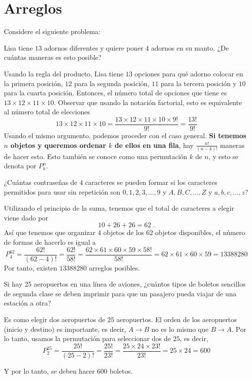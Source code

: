 \documentclass[12pt]{article}
\begin{document}
\section{Arreglos}
Considere el siguiente problema:

\begin{center}
    Lisa tiene $13$ adornos diferentes y quiere poner $4$ adornos en su manto. ¿De cuántas maneras es esto posible?
\end{center}
Usando la regla del producto, Lisa tiene $13$ opciones para qué adorno colocar en la primera posición, $12$ para la segunda posición, $11$ para la tercera posición y $10$ para la cuarta posición. Entonces, el número total de opciones que tiene es $13 \times 12 \times 11 \times 10$. Observar que usando la notación factorial, esto es equivalente al número total de elecciones
\[13\times 12\times 11\times 10=\frac{13\times 12\times 11\times 10\times 9!}{9!}=\frac{13!}{9!}\]
Usando el mismo argumento, podemos proceder con el caso general. \textbf{Si tenemos $n$ objetos y queremos ordenar $k$ de ellos en una fila}, hay $\displaystyle\frac{n!}{(n-k)!}$ maneras de hacer esto. Esto también se conoce como una permutación $k$ de $n$, y esto se denota por $\displaystyle P_k^n$.
\begin{ejemplo}
    ¿Cuántas contraseñas de $4$ caracteres se pueden formar si los caracteres permitidos para usar sin repetición son $0, 1, 2, 3, ..., 9$ y $A, B, C, ..., Z$ y $a, b, c, ..., z$?
\end{ejemplo}
\begin{solucion}
    Utilizando el principio de la suma, tenemos que el total de caracteres a elegir viene dado por
    \[10+26+26=62\;.\]
    Así que tenemos que organizar $4$ objetos de los $62$ objetos disponibles, el número de formas de hacerlo es igual a
    \[P^{62}_4=\frac{62!}{(62-4)!}=\frac{62!}{58!}=\frac{62\times 61\times 60\times 59\times 58!}{58!}=62\times 61\times 60\times 59=13388280\]
    Por tanto, existen $13388280$ arreglos posibles.
\end{solucion}
\begin{ejemplo}
Si hay 25 aeropuertos en una línea de aviones, ¿cuántos tipos de boletos sencillos de segunda clase se deben imprimir para que un pasajero pueda viajar de una estación a otra?
\end{ejemplo}

\begin{solucion}
Es como elegir dos aeropuertos de $25$ aeropuertos. El orden de los aeropuertos (inicio y destino) es importante, es decir, $A\longrightarrow B$ no es lo mismo que $B\longrightarrow A$. Por lo tanto, usamos la permutación para seleccionar dos de $25$, es decir,
\[P^{25}_2=\frac{25!}{(25-2)!}=\frac{25!}{23!}=\frac{25\times 24\times 23!}{23!}=25\times 24=600\]
\end{solucion}
Y por lo tanto, se deben hacer $600$ boletos.
\end{document}
